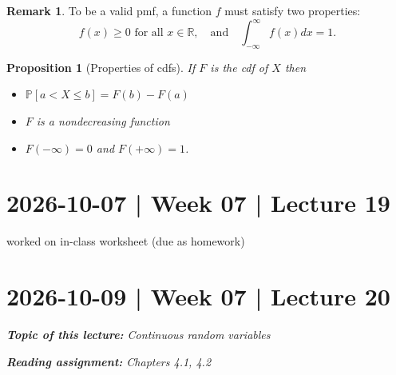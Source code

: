 \documentclass[10pt]{article}
\newtheorem{proposition}[theorem]{Proposition}
\theoremstyle{definition}
\newtheorem{remark}[theorem]{Remark}
\newcommand{\1}[1]{\textbf{1}_{\left[#1\right]}} %
\def\P{\mathbb{P}} %
\begin{document}
\begin{remark}
  To be a valid pmf, a function $f$ must satisfy two properties:
  \begin{equation*}
    f(x) \geq 0 \text{ for all } x\in \mathbb{R}, \quad \text{and} \quad  \int_{-\infty}^{\infty}f(x)dx=1.
  \end{equation*}
\end{remark}



\begin{proposition}[Properties of cdfs]
  If $F$ is the cdf of $X$ then 
  \begin{itemize}
    \item $\P\left[a < X \leq b\right] = F(b)-F(a)$
    \item $F$ is a nondecreasing function
    \item  $F(-\infty)=0$ and $F(+\infty)=1$.
  \end{itemize}
\end{proposition}



\newpage
\section{2026-10-07 | Week 07 | Lecture 19}


worked on in-class worksheet (due as homework)
\newpage

\section{2026-10-09 | Week 07 | Lecture 20}
\begin{center}
  \begin{tcolorbox}[width=0.9\textwidth, colback=white, colframe=black]
    \textit{\textbf{Topic of this lecture:} Continuous random variables}

    \textit{\textbf{Reading assignment:} Chapters 4.1, 4.2}
  \end{tcolorbox}
\end{center}
\end{document}
